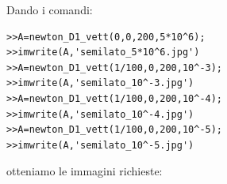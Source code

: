 \documentclass[11pt,a4paper,twoside,openright,titlepage,
headinclude,footinclude,BCOR5mm,
numbers=noenddot,cleardoublepage=empty,
tablecaptionabove]{scrbook}
\begin{document}
Dando i comandi:
\begin{lstlisting}[frame=lines]
>>A=newton_D1_vett(0,0,200,5*10^6);
>>imwrite(A,'semilato_5*10^6.jpg')
>>A=newton_D1_vett(1/100,0,200,10^-3);
>>imwrite(A,'semilato_10^-3.jpg')
>>A=newton_D1_vett(1/100,0,200,10^-4);
>>imwrite(A,'semilato_10^-4.jpg')
>>A=newton_D1_vett(1/100,0,200,10^-5);
>>imwrite(A,'semilato_10^-5.jpg')
\end{lstlisting}
otteniamo le immagini richieste:
\begin{figure}[h!]
\centering
{} \quad
{} \\
 \quad

\end{figure}
\end{document}
